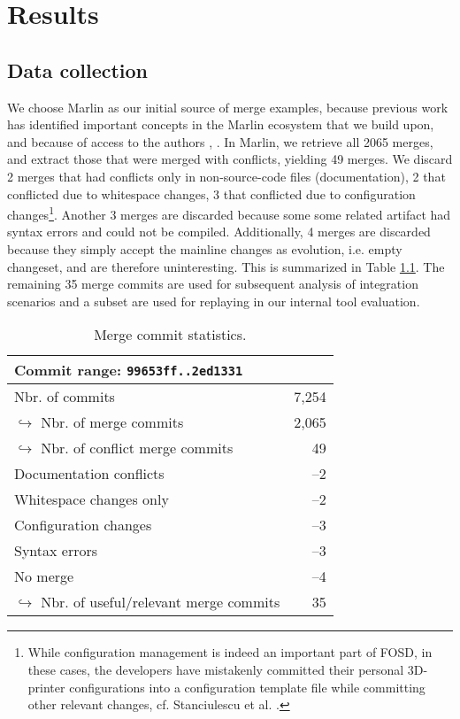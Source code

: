 \chapter{Results}

\section{Data collection}
We choose Marlin as our initial source of merge examples, because previous work has identified important concepts in the Marlin ecosystem that we build upon, and because of access to the authors \cite{stanciulescu2015}, \cite{stanciulescu2016concepts}. In Marlin, we retrieve all 2065 merges, and extract those that were merged with conflicts, yielding 49 merges. We discard 2 merges that had conflicts only in non-source-code files (documentation), 2 that conflicted due to whitespace changes, 3 that conflicted due to configuration changes\footnote{While configuration management is indeed an important part of FOSD, in these cases, the developers have mistakenly committed their personal 3D-printer configurations into a configuration template file while committing other relevant changes, cf. Stanciulescu et al. \cite{stanciulescu2015}.}. Another 3 merges are discarded because some some related artifact had syntax errors and could not be compiled. Additionally, 4 merges are discarded because they simply accept the mainline changes as evolution, i.e. empty changeset, and are therefore uninteresting. This is summarized in Table \ref{tab:marlinmerge}. The remaining 35 merge commits are used for subsequent analysis of integration scenarios and a subset are used for replaying in our internal tool evaluation.

\begin{table}[h]
    \centering
    \caption{Merge commit statistics.}
    \label{tab:marlinmerge}
    \begin{tabular}{l r}
    \hline\hline
        Commit range: \texttt{99653ff..2ed1331}& \\\hline
        Nbr. of commits & 7,254\\
        $\hookrightarrow$ Nbr. of merge commits & 2,065 \\
        \hspace{1em}$\hookrightarrow$ Nbr. of conflict merge commits & 49 \\
        \hspace{1em}Documentation conflicts & --2\\
        \hspace{1em}Whitespace changes only & --2\\
        \hspace{1em}Configuration changes & --3\\
        \hspace{1em}Syntax errors & --3\\
        \hspace{1em}No merge & --4\\
        \hspace{2em}$\hookrightarrow$ Nbr. of useful/relevant merge commits & 35\\
    \hline\hline
    \end{tabular}
\end{table}


